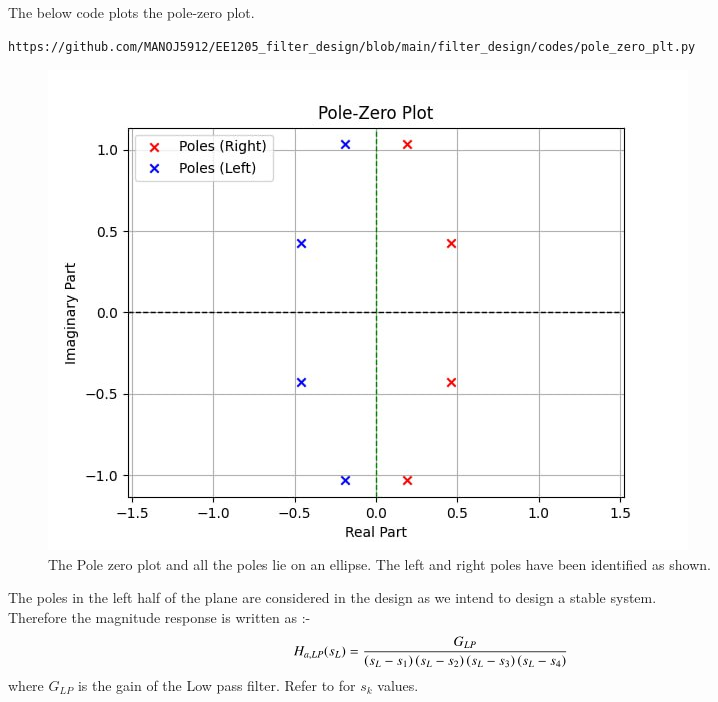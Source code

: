 \documentclass{article}
\begin{document}
\begin{enumerate}
 The below code plots the pole-zero plot.
\begin{lstlisting}
https://github.com/MANOJ5912/EE1205_filter_design/blob/main/filter_design/codes/pole_zero_plt.py
\end{lstlisting}
 \begin{figure}[H]
  \centering
 \includegraphics[width=1\columnwidth]{figs/Pole_Zero_plt.png}
  \caption{The Pole zero plot and all the poles lie on an ellipse. The left and right poles have been identified as shown.}
  \label{fig:pole_zero_plt}
\end{figure}
The poles in the left half of the plane are considered in the design as we intend to design a stable system.\\
 Therefore the magnitude response is written as :- 
 \begin{align}
     H_{a,LP}(s_L) & = \frac{G_{LP}}{\left(s_L-s_1\right)\left(s_L-s_2\right)\left(s_L-s_3\right)\left(s_L-s_4\right)}
  \end{align}
  where $G_{LP}$ is the gain of the Low pass filter. Refer to  for $s_k$ values.\\
          

\end{enumerate}
\end{document}
